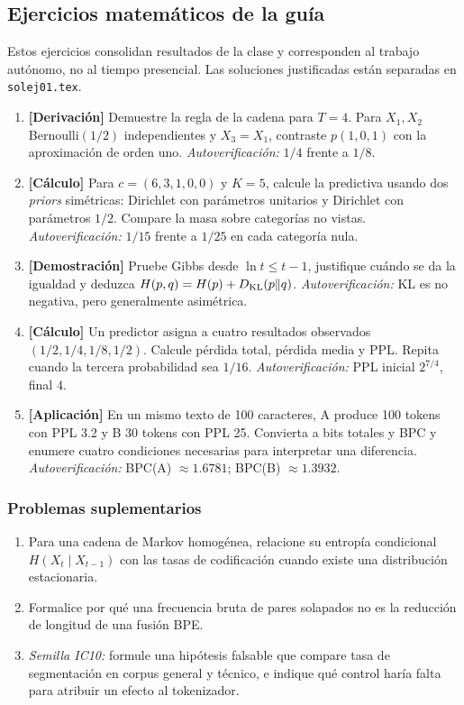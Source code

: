 \subsection{Ejercicios matemáticos de la guía}

\noindent Estos ejercicios consolidan resultados de la clase y corresponden al
trabajo autónomo, no al tiempo presencial. Las soluciones justificadas están
separadas en \texttt{solej01.tex}.
\begin{enumerate}
\item \textbf{[Derivación]} Demuestre la regla de la cadena para $T=4$.
Para $X_1,X_2$ Bernoulli$(1/2)$ independientes y $X_3=X_1$,
contraste $p(1,0,1)$ con la aproximación de orden uno.
\emph{Autoverificación:} $1/4$ frente a $1/8$.
\item \textbf{[Cálculo]} Para $c=(6,3,1,0,0)$ y $K=5$,
calcule la predictiva usando dos \emph{priors} simétricas:
Dirichlet con parámetros unitarios y Dirichlet con parámetros $1/2$.
Compare la masa sobre categorías no vistas.
\emph{Autoverificación:} $1/15$ frente a $1/25$ en cada categoría nula.
\item \textbf{[Demostración]} Pruebe Gibbs desde $\ln t\le t-1$,
justifique cuándo se da la igualdad y deduzca
$H(p,q)=H(p)+D_{\rm KL}(p\|q)$.
\emph{Autoverificación:} KL es no negativa, pero generalmente asimétrica.
\item \textbf{[Cálculo]} Un predictor asigna a cuatro resultados observados
$(1/2,1/4,1/8,1/2)$. Calcule pérdida total, pérdida media y
PPL. Repita cuando la tercera probabilidad sea $1/16$.
\emph{Autoverificación:} PPL inicial $2^{7/4}$, final $4$.
\item \textbf{[Aplicación]} En un mismo texto de 100 caracteres, A
produce 100 tokens con PPL 3.2 y B 30 tokens con PPL 25.
Convierta a bits totales y BPC y enumere cuatro condiciones necesarias
para interpretar una diferencia.
\emph{Autoverificación:} BPC(A) $\approx1.6781$;
BPC(B) $\approx1.3932$.
\end{enumerate}
\subsubsection*{Problemas suplementarios}
\begin{enumerate}
\item[(S1.A)] Para una cadena de Markov homogénea, relacione su
entropía condicional $H(X_t\mid X_{t-1})$ con las tasas de
codificación cuando existe una distribución estacionaria.
\item[(S1.B)] Formalice por qué una frecuencia bruta de pares solapados
no es la reducción de longitud de una fusión BPE.
\item[(S1.C)] \emph{Semilla IC10:} formule una hipótesis falsable que
compare tasa de segmentación en corpus general y técnico, e indique
qué control haría falta para atribuir un efecto al tokenizador.
\end{enumerate}

